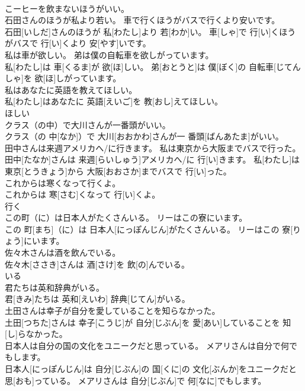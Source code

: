 \documentclass[8pt]{extreport}
\begin{document}
\begin{CJK}{UTF8}{min}
\\	こーヒーを飲まないほうがいい。　
\\	石田さんのほうが私より若い。 車で行くほうがバスで行くより安いです。	
\\	石田[いしだ]さんのほうが 私[わたし]より 若[わか]い。 車[しゃ]で 行[い]くほうがバスで 行[い]くより 安[やす]いです。	
\\	私は車が欲しい。 弟は僕の自転車を欲しがっています。	
\\	私[わたし]は 車[くるま]が 欲[ほ]しい。 弟[おとうと]は 僕[ぼく]の 自転車[じてんしゃ]を 欲[ほ]しがっています。	
\\	私はあなたに英語を教えてほしい。	
\\	私[わたし]はあなたに 英語[えいご]を 教[おし]えてほしい。	
\\	ほしい	
\\	クラス（の中）で大川さんが一番頭がいい。	
\\	クラス（の 中[なか]）で 大川[おおかわ]さんが一 番頭[ばんあたま]がいい。	
\\	田中さんは来週アメリカへ/に行きます。 私は東京から大阪までバスで行った。	
\\	田中[たなか]さんは 来週[らいしゅう]アメリカへ/に 行[い]きます。 私[わたし]は 東京[とうきょう]から 大阪[おおさか]までバスで 行[い]った。	
\\	これからは寒くなって行くよ。	
\\	これからは 寒[さむ]くなって 行[い]くよ。	
\\	行く	
\\	この町（に）は日本人がたくさんいる。 リーはこの寮にいます。	
\\	この 町[まち]（に）は 日本人[にっぽんじん]がたくさんいる。 リーはこの 寮[りょう]にいます。	
\\	佐々木さんは酒を飲んでいる。	
\\	佐々木[ささき]さんは 酒[さけ]を 飲[の]んでいる。	
\\	いる	
\\	君たちは英和辞典がいる。	
\\	君[きみ]たちは 英和[えいわ] 辞典[じてん]がいる。	
\\	土田さんは幸子が自分を愛していることを知らなかった。	
\\	土田[つちた]さんは 幸子[こうじ]が 自分[じぶん]を 愛[あい]していることを 知[し]らなかった。	
\\	日本人は自分の国の文化をユニークだと思っている。 メアリさんは自分で何でもします。	
\\	日本人[にっぽんじん]は 自分[じぶん]の 国[くに]の 文化[ぶんか]をユニークだと 思[おも]っている。 メアリさんは 自分[じぶん]で 何[なに]でもします。	

\end{CJK}
\end{document}
